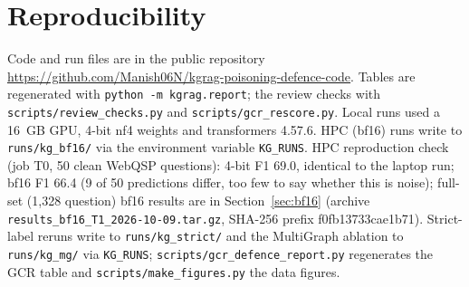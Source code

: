\documentclass[preprint,12pt]{elsarticle}
\begin{document}
\section{Reproducibility}\label{app:repro}
\begin{sloppypar}
Code and run files are in the public repository \url{https://github.com/Manish06N/kgrag-poisoning-defence-code}. Tables are regenerated with \texttt{python -m kgrag.report}; the review checks with \texttt{scripts/review\_checks.py} and \texttt{scripts/gcr\_rescore.py}. Local runs used a 16~GB GPU, 4-bit nf4 weights and transformers 4.57.6. HPC (bf16) runs write to \texttt{runs/kg\_bf16/} via the environment variable \texttt{KG\_RUNS}. HPC reproduction check (job T0, 50 clean WebQSP questions): 4-bit F1 69.0, identical to the laptop run; bf16 F1 66.4 (9 of 50 predictions differ, too few to say whether this is noise); full-set (1,328 question) bf16 results are in Section~\ref{sec:bf16} (archive \texttt{results\_bf16\_T1\_2026-10-09.tar.gz}, SHA-256 prefix f0fb13733cae1b71). Strict-label reruns write to \texttt{runs/kg\_strict/} and the MultiGraph ablation to \texttt{runs/kg\_mg/} via \texttt{KG\_RUNS}; \texttt{scripts/gcr\_defence\_report.py} regenerates the GCR table and \texttt{scripts/make\_figures.py} the data figures.

\end{sloppypar}
\end{document}
